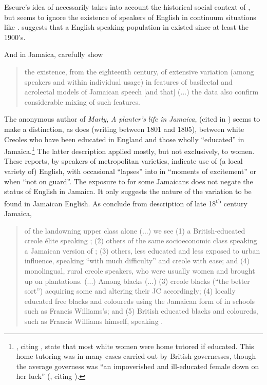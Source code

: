 Escure’s idea of  necessarily takes into account the historical social context of , but seems to ignore the existence of  speakers of English in continuum situations like .  \citet[148--151]{Judd1998} suggests that a  English speaking population in  existed since at least the 1900's.  

And in Jamaica, \citet[98]{LallaDCosta1990} carefully show

\begin{quote}the existence, from the eighteenth century, of extensive variation (among speakers and within individual usage) in features of basilectal and acrolectal models of Jamaican speech [and that] (...) the data also confirm considerable mixing of such features.\end{quote} 

The anonymous author of \textit{Marly,} \textit{A} \textit{planter’s} \textit{life in} \textit{Jamaica}, (cited in \citealt[44]{LallaDCosta1989}) seems to make a distinction, as does  (writing between 1801 and 1805), between white Creoles who have been educated in England and those wholly “educated” in Jamaica.\footnote{\citet[90]{LallaDCosta1990}, citing \citet{Long1774}, state that most  white women were home tutored if educated.  This home tutoring was in many cases carried out by British governesses, though the average governess was “an impoverished and ill-educated female down on her luck” (\citealt[83]{Brereton1995}, citing \citealt{Carmichael1833}).}   The latter description applied mostly, but not exclusively, to women.  These reports, by speakers of metropolitan varieties, indicate use of (a local variety of) English, with occasional “lapses” into  in “moments of excitement” or when “not on guard”.  The exposure to  for some Jamaicans does not negate the  status of English in Jamaica.  It only suggests the nature of the variation to be found in Jamaican English.  As \citet{LallaDCosta1990} conclude from  description of late 18\textsuperscript{th} century Jamaica, 

\begin{quote}of the landowning upper class alone (...) we see (1) a British-educated creole élite speaking ; (2) others of the same socioeconomic class speaking a Jamaican version of ; (3) others, less educated and less exposed to urban influence, speaking  “with much difficulty” and creole with ease; and (4) monolingual, rural creole speakers, who were usually women and brought up on plantations. (...) Among blacks (...) (3) creole blacks (“the better sort”) acquiring some  and altering their JC accordingly; (4) locally educated free blacks and coloureds using the Jamaican form of  in schools such as Francis Williams’s; and (5) British educated blacks and coloureds, such as Francis Williams himself, speaking .\end{quote}

